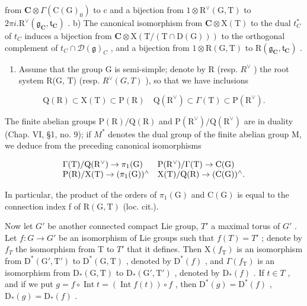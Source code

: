 from \(\mathbf{C}\otimes\varGamma(\mathrm{C}(\mathrm{G})_{0})\) to c and a bijection from \(1\otimes\mathrm{R}^{\vee}(\mathrm{G},\mathrm{T})\) to \(2\pi i.\mathrm{R}^{\vee}(\mathfrak{g}_{\mathbf{C}},\mathfrak{t}_{\mathbf{C}})\) . b) The canonical isomorphism from \(\mathbf{C}\otimes\mathrm{X}(\mathrm{T})\) to the dual \(t_{C}^{*}\) of \(t_{C}\) induces a bijection from \(\mathbf{C}\otimes\mathrm{X}(\mathrm{T}/(\mathrm{T}\cap\mathrm{D}(\mathrm{G})))\) to the orthogonal complement of \(t_{C}\cap\mathcal{D}(\mathfrak{g})_{C}\) , and a bijection from \(1\otimes\mathrm{R}(\mathrm{G},\mathrm{T})\) to \(\mathrm{R}(\mathfrak{g}_{\mathbf{C}},\mathfrak{t}_{\mathbf{C}})\) .

\begin{enumerate}
\def\labelenumi{\arabic{enumi})}
\setcounter{enumi}{1}
\tightlist
\item
  Assume that the group G is semi-simple; denote by R (resp. \(R^{\vee}\) ) the root system R(G, T) (resp. \(R^{\vee}(G, T)\) ), so that we have inclusions
\end{enumerate}

\[
\mathrm{Q} (\mathrm{R}) \subset \mathrm{X} (\mathrm{T}) \subset \mathrm{P} (\mathrm{R}) \quad \mathrm{Q} (\mathrm{R} ^ {\vee}) \subset \Gamma (\mathrm{T}) \subset \mathrm{P} (\mathrm{R} ^ {\vee}).
\]

The finite abelian groups \(\mathrm{P}(\mathrm{R})/\mathrm{Q}(\mathrm{R})\) and \(\mathrm{P}(\mathrm{R}^{\vee})/\mathrm{Q}(\mathrm{R}^{\vee})\) are in duality (Chap. VI, §1, no. 9); if \(M^{*}\) denotes the dual group of the finite abelian group M, we deduce from the preceding canonical isomorphisms

\[
\begin{array}{l l} \Gamma (\mathrm{T}) / \mathrm{Q} (\mathrm{R} ^ {\vee}) \to \pi_ {1} (\mathrm{G}) & \mathrm{P} (\mathrm{R} ^ {\vee}) / \Gamma (\mathrm{T}) \to \mathrm{C} (\mathrm{G}) \\ \mathrm{P} (\mathrm{R}) / \mathrm{X} (\mathrm{T}) \to (\pi_ {1} (\mathrm{G})) ^ {\wedge} & \mathrm{X} (\mathrm{T}) / \mathrm{Q} (\mathrm{R}) \to (\mathrm{C} (\mathrm{G})) ^ {\wedge}. \end{array}
\]

In particular, the product of the orders of \(\pi_{1}(\mathrm{G})\) and \(\mathrm{C}(\mathrm{G})\) is equal to the connection index f of \(\mathrm{R}(\mathrm{G},\mathrm{T})\) (loc. cit.).

Now let \(G'\) be another connected compact Lie group, \(T'\) a maximal torus of \(G'\) . Let \(f: G \to G'\) be an isomorphism of Lie groups such that \(f(T) = T'\) ; denote by \(f_{T}\) the isomorphism from T to \(T'\) that it defines. Then \(\mathrm{X}(f_{\mathrm{T}})\) is an isomorphism from \(\mathrm{D}^{*}(\mathrm{G}', \mathrm{T}')\) to \(\mathrm{D}^{*}(\mathrm{G}, \mathrm{T})\) , denoted by \(\mathrm{D}^{*}(f)\) , and \(\Gamma(f_{\mathrm{T}})\) is an isomorphism from \(\mathrm{D}_{*}(\mathrm{G}, \mathrm{T})\) to \(\mathrm{D}_{*}(\mathrm{G}', \mathrm{T}')\) , denoted by \(\mathrm{D}_{*}(f)\) . If \(t \in T\) , and if we put \(g = f \circ \operatorname{Int} t = (\operatorname{Int} f(t)) \circ f\) , then \(\mathrm{D}^{*}(g) = \mathrm{D}^{*}(f)\) , \(\mathrm{D}_{*}(g) = \mathrm{D}_{*}(f)\) .

